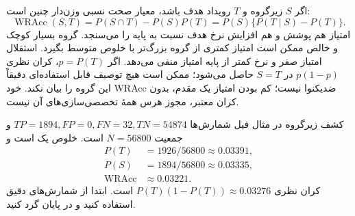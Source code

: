 اگر $S$ زیرگروه و $T$ رویداد هدف باشد، معیار صحت نسبی وزن‌دار چنین است:
\[\operatorname{WRAcc}(S,T)=P(S\cap T)-P(S)P(T)=P(S)\{P(T\mid S)-P(T)\}.\]
امتیاز هم پوشش و هم افزایش نرخ هدف نسبت به پایه را می‌سنجد. گروه بسیار کوچک و خالص ممکن است امتیاز کمتری از گروه بزرگ‌تر با خلوص متوسط بگیرد. استقلال امتیاز صفر و نرخ کمتر از پایه امتیاز منفی می‌دهد. اگر $p=P(T)$، کران نظری $p(1-p)$ در $S=T$ حاصل می‌شود؛ ممکن است هیچ توصیف قابل استفاده‌ای دقیقاً این گروه را بیان نکند. خود WRAcc ضدیکنوا نیست؛ کم بودن امتیاز یک مقدم، بدون کران معتبر، مجوز هرس همهٔ تخصصی‌سازی‌های آن نیست.

\begin{example}{کشف زیرگروه در مثال فیل}
شمارش‌ها $TP=1894,FP=0,FN=32,TN=54874$ و جمعیت $N=56800$ است. خلوص یک است و
\begin{align*}
P(T)&=1926/56800\approx0.03391,\\
P(S)&=1894/56800\approx0.03335,\\
\operatorname{WRAcc}&\approx0.03221.
\end{align*}
کران نظری $P(T)(1-P(T))\approx0.03276$ است. ابتدا از شمارش‌های دقیق استفاده کنید و در پایان گرد کنید.
\end{example}

